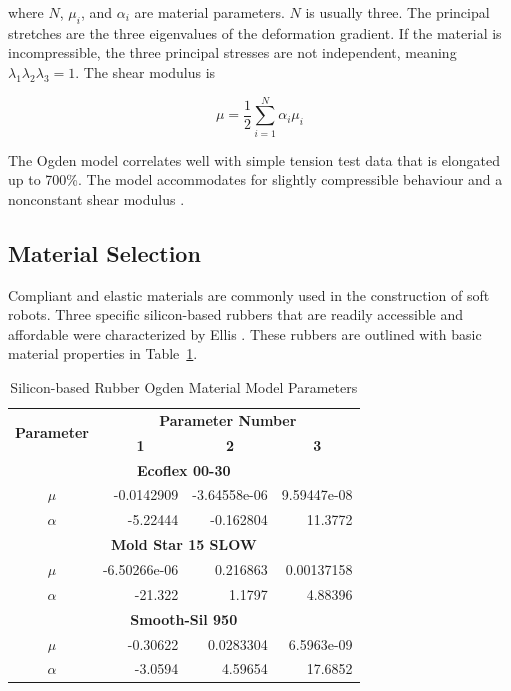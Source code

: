 where $N$, $\mu_{i}$, and $\alpha_{i}$ are material parameters. $N$ is usually three. The principal stretches are the three eigenvalues of the deformation gradient. If the material is incompressible, the three principal stresses are not independent, meaning $\lambda_{1}\lambda_{2}\lambda_{3}=1$. The shear modulus is

\begin{equation}
	\mu=\frac{1}{2}\sum_{i=1}^{N}\alpha_{i}\mu_{i}
\end{equation}

The Ogden model correlates well with simple tension test data that is elongated up to 700\%. The model accommodates for slightly compressible behaviour and a nonconstant shear modulus \cite{Kim2015}.

\subsection{Material Selection}

Compliant and elastic materials are commonly used in the construction of soft robots. Three specific silicon-based rubbers that are readily accessible and affordable were characterized by Ellis \cite{Ellis2020}. These rubbers are outlined with basic material properties in Table~\ref{tab:ogdpar}.

\begin{table}[H]
\centering
\begin{tabular}{@{}crrr@{}}
\toprule
\multirow{2}{*}{\textbf{Parameter}} & \multicolumn{3}{c}{\textbf{Parameter Number}}                                                    \\ \cmidrule(l){2-4} 
                                    & \multicolumn{1}{c}{\textbf{1}} & \multicolumn{1}{c}{\textbf{2}} & \multicolumn{1}{c}{\textbf{3}} \\ \midrule
\multicolumn{4}{c}{\textbf{Ecoflex 00-30}}           \\ \midrule
$\mu$    & -0.0142909   & -3.64558e-06 & 9.59447e-08 \\
$\alpha$ & -5.22444     & -0.162804    & 11.3772     \\ \midrule
\multicolumn{4}{c}{\textbf{Mold Star 15 SLOW}}       \\ \midrule
$\mu$    & -6.50266e-06 & 0.216863     & 0.00137158  \\
$\alpha$ & -21.322      & 1.1797       & 4.88396     \\ \midrule
\multicolumn{4}{c}{\textbf{Smooth-Sil 950}}          \\ \midrule
$\mu$    & -0.30622     & 0.0283304    & 6.5963e-09  \\
$\alpha$ & -3.0594      & 4.59654      & 17.6852     \\ \bottomrule
\end{tabular}
\caption{Silicon-based Rubber Ogden Material Model Parameters \cite{Ellis2020}}
\label{tab:ogdpar}
\end{table}

